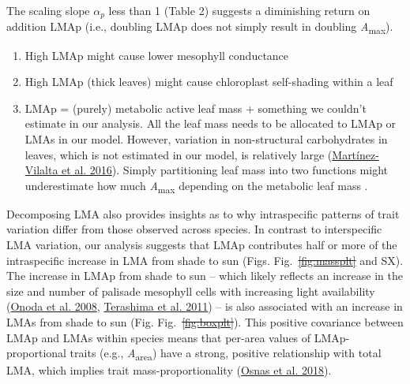 \documentclass[
  12pt,
  a4paper,
,tablecaptionabove
]{scrartcl}
\providecommand{\tightlist}{%
  \setlength{\itemsep}{0pt}\setlength{\parskip}{0pt}}
\providecommand{\DIFaddtex}[1]{{\protect\color{blue}\uwave{#1}}} %
\providecommand{\DIFdeltex}[1]{{\protect\color{red}\sout{#1}}}                      %
\providecommand{\DIFaddbegin}{} %
\providecommand{\DIFaddend}{} %
\providecommand{\DIFdelbegin}{} %
\providecommand{\DIFdelend}{} %
\providecommand{\DIFadd}[1]{\texorpdfstring{\DIFaddtex{#1}}{#1}} %
\providecommand{\DIFdel}[1]{\texorpdfstring{\DIFdeltex{#1}}{}} %
\newcommand{\DIFscaledelfig}{0.5}
\newlength{\DIFdelgraphicswidth} %
\newlength{\DIFdelgraphicsheight} %
\newcommand{\DIFaddincludegraphics}[2][]{{\color{blue}\fbox{\DIFOincludegraphics[#1]{#2}}}} %
\newcommand{\DIFdelincludegraphics}[2][]{%
\sbox{\DIFdelgraphicsbox}{\DIFOincludegraphics[#1]{#2}}%
\settoboxwidth{\DIFdelgraphicswidth}{\DIFdelgraphicsbox} %
\settoboxtotalheight{\DIFdelgraphicsheight}{\DIFdelgraphicsbox} %
\scalebox{\DIFscaledelfig}{%
\parbox[b]{\DIFdelgraphicswidth}{\usebox{\DIFdelgraphicsbox}\\[-\baselineskip] \rule{\DIFdelgraphicswidth}{0em}}\llap{\resizebox{\DIFdelgraphicswidth}{\DIFdelgraphicsheight}{%
\setlength{\unitlength}{\DIFdelgraphicswidth}%
\begin{picture}(1,1)%
\thicklines\linethickness{2pt} %
{\color[rgb]{1,0,0}\put(0,0){\framebox(1,1){}}}%
{\color[rgb]{1,0,0}\put(0,0){\line( 1,1){1}}}%
{\color[rgb]{1,0,0}\put(0,1){\line(1,-1){1}}}%
\end{picture}%
}\hspace*{3pt}}} %
} %
\DeclareRobustCommand{\DIFaddbegin}{\DIFOaddbegin \let\includegraphics\DIFaddincludegraphics} %
\DeclareRobustCommand{\DIFaddend}{\DIFOaddend \let\includegraphics\DIFOincludegraphics} %
\DeclareRobustCommand{\DIFdelbegin}{\DIFOdelbegin \let\includegraphics\DIFdelincludegraphics} %
\DeclareRobustCommand{\DIFdelend}{\DIFOaddend \let\includegraphics\DIFOincludegraphics} %
\begin{document}
The scaling slope \(\alpha_p\) less than 1 (Table 2) suggests a
diminishing return on addition LMAp (i.e., doubling LMAp does not simply
result in doubling \emph{A}\textsubscript{max}).

\begin{enumerate}
\def\labelenumi{\arabic{enumi}.}
\tightlist
\item
  High LMAp might cause lower mesophyll conductance
\item
  High LMAp (thick leaves) might cause chloroplast self-shading within a
  leaf
\item
  LMAp = (purely) metabolic active leaf mass + something we couldn't
  estimate in our analysis. All the leaf mass needs to be allocated to
  LMAp or LMAs in our model. However, variation in non-structural
  carbohydrates in leaves, which is not estimated in our model, is
  relatively large
  (\protect\hyperlink{ref-Martinez-Vilalta2016}{Martínez-Vilalta et al.
  2016}). Simply partitioning leaf mass into two functions might
  underestimate how much \emph{A}\textsubscript{max} depending on the
  metabolic leaf mass .
\end{enumerate}

Decomposing LMA also provides insights as to why intraspecific patterns
of trait variation differ from those observed across species. In
contrast to interspecific LMA variation, our analysis suggests that LMAp
contributes half or more of the intraspecific increase in LMA from shade
to sun (Figs. Fig.~\DIFdelbegin \DIFdel{\ref{fig:massplt} }\DIFdelend \DIFaddbegin \DIFadd{\ref{fig-massplt} }\DIFaddend and SX). The increase in LMAp from
shade to sun -- which likely reflects an increase in the size and number
of palisade mesophyll cells with increasing light availability
(\protect\hyperlink{ref-Onoda2008}{Onoda et al. 2008},
\protect\hyperlink{ref-Terashima2011}{Terashima et al. 2011}) -- is also
associated with an increase in LMAs from shade to sun (Fig.
Fig.~\DIFdelbegin \DIFdel{\ref{fig:boxplt}}\DIFdelend \DIFaddbegin \DIFadd{\ref{fig-boxplt}}\DIFaddend ). This positive covariance between LMAp and LMAs
within species means that per-area values of LMAp-proportional traits
(e.g., \emph{A}\textsubscript{area}) have a strong, positive
relationship with total LMA, which implies trait mass-proportionality
(\protect\hyperlink{ref-Osnas2018}{Osnas et al. 2018}).
\end{document}

